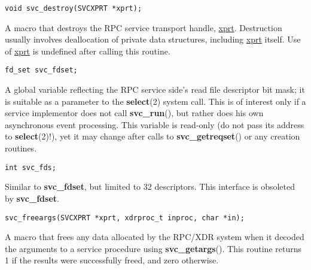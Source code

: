 \documentclass[]{article}
\let\realtextbf=\textbf
\renewcommand{\textbf}[1]{\textcolor{boldcolor}{\realtextbf{#1}}}
\renewcommand{\emph}[1]{\underline{#1}}
\begin{document}
\begin{verbatim}
void svc_destroy(SVCXPRT *xprt);
\end{verbatim}

\begin{description}
\itemsep1pt\parskip0pt
\item[]
A macro that destroys the RPC service transport handle, \emph{xprt}.
Destruction usually involves deallocation of private data structures,
including \emph{xprt} itself. Use of \emph{xprt} is undefined after
calling this routine.
\end{description}

\begin{verbatim}
fd_set svc_fdset;
\end{verbatim}

\begin{description}
\itemsep1pt\parskip0pt
\item[]
A global variable reflecting the RPC service side's read file descriptor
bit mask; it is suitable as a parameter to the \textbf{select}(2) system
call. This is of interest only if a service implementor does not call
\textbf{svc\_run}(), but rather does his own asynchronous event
processing. This variable is read-only (do not pass its address to
\textbf{select}(2)!), yet it may change after calls to
\textbf{svc\_getreqset}() or any creation routines.
\end{description}

\begin{verbatim}
int svc_fds;
\end{verbatim}

\begin{description}
\itemsep1pt\parskip0pt
\item[]
Similar to \textbf{svc\_fdset}, but limited to 32 descriptors. This
interface is obsoleted by \textbf{svc\_fdset}.
\end{description}

\begin{verbatim}
svc_freeargs(SVCXPRT *xprt, xdrproc_t inproc, char *in);
\end{verbatim}

\begin{description}
\itemsep1pt\parskip0pt
\item[]
A macro that frees any data allocated by the RPC/XDR system when it
decoded the arguments to a service procedure using
\textbf{svc\_getargs}(). This routine returns 1 if the results were
successfully freed, and zero otherwise.
\end{description}
\end{document}
